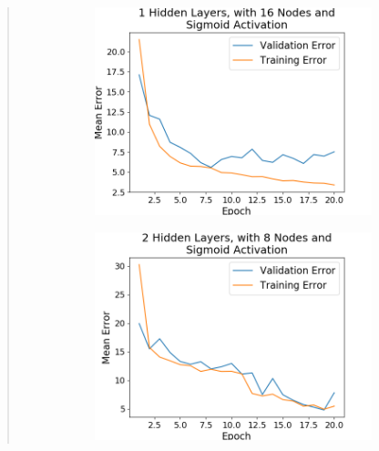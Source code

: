 \documentclass{article}
\begin{document}
\begin{quote}
\begin{figure}[h]
\begin{subfigure}[h]{0.23\textwidth}
		\end{subfigure}
		\begin{subfigure}[h]{0.23\textwidth}
			\includegraphics[width=\textwidth]{figs/Boston_Housing_Regression_1_Hidden_Layers_with_16_Nodes_and_Sigmoid_Activation.png}
		\end{subfigure}
		\begin{subfigure}[h]{0.23\textwidth}
		\includegraphics[width=\textwidth]{figs/Boston_Housing_Regression_2_Hidden_Layers_with_8_Nodes_and_Sigmoid_Activation.png}
		\end{subfigure}
		\begin{subfigure}[h]{0.23\textwidth}

\end{subfigure}
\end{figure}
\end{quote}
\end{document}
